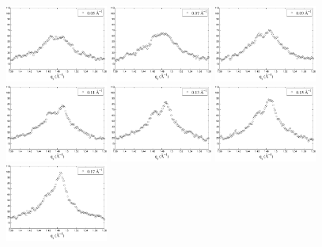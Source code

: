 \begin{figure}
  \centering
  \includegraphics[width=0.3\textwidth]{figures/ripple/qrplot0}
  \includegraphics[width=0.3\textwidth]{figures/ripple/qrplot1}
  \includegraphics[width=0.3\textwidth]{figures/ripple/qrplot2}
  \includegraphics[width=0.3\textwidth]{figures/ripple/qrplot3}
  \includegraphics[width=0.3\textwidth]{figures/ripple/qrplot4}
  \includegraphics[width=0.3\textwidth]{figures/ripple/qrplot5}
  \includegraphics[width=0.3\textwidth]{figures/ripple/qrplot6}

\end{figure}

